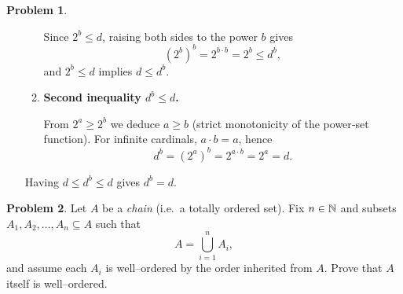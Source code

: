 \documentclass[12pt]{article}
\theoremstyle{definition} %
\newtheorem{problem}{Problem}
\theoremstyle{plain} %
\begin{document}
\begin{problem}
\begin{enumerate}
\begin{enumerate}
                      Since $2^{b}\le d$, raising both sides to the power $b$ gives
                      \[
                          (2^{b})^{b}=2^{b\cdot b}=2^{b}\le d^{b},
                      \]
                      and $2^{b}\le d$ implies $d\le d^{b}$.

                \item \textbf{Second inequality $d^{b}\le d$.}  
                
                      From $2^{a}\ge 2^{b}$ we deduce $a\ge b$ (strict monotonicity of the power‑set function).  
                      For infinite cardinals, $a\cdot b=a$, hence
                      \[
                          d^{b}=(2^{a})^{b}=2^{a\cdot b}=2^{a}=d.
                      \]
            \end{enumerate}

            Having $d\le d^{b}\le d$ gives $d^{b}=d$.
  \end{enumerate}
\end{problem}

\begin{problem}
  Let $A$ be a \emph{chain} (i.e.\ a totally ordered set).  
  Fix $n\in\Bbb N$ and subsets $A_1,A_2,\dots,A_n\subseteq A$ such that
  \[
      A=\bigcup_{i=1}^n A_i,
  \]
  and assume each $A_i$ is well--ordered by the order inherited from $A$.  
  Prove that $A$ itself is well--ordered.
\end{problem}
\end{document}
